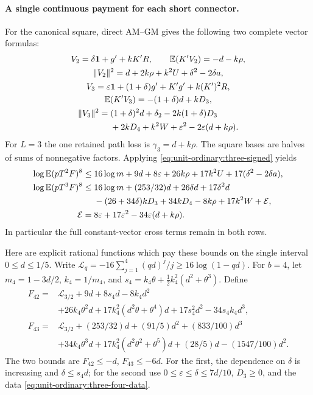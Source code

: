 \paragraph{A single continuous payment for each short connector.}
For the canonical square, direct AM--GM gives the following two
complete vector formulas:
\begin{equation}\label{eq:unit-ordinary:three-short-vectors}
\begin{gathered}
 V_2=\delta\mathbf1+g'+kK'R,\qquad
 \mathbb E(K'V_2)=-d-k\rho,\\
 \|V_2\|^2=d+2k\rho+k^2U+\delta^2-2\delta a,\\
 V_3=\varepsilon\mathbf1+(1+\delta)g'+K'g'+k(K')^2R,\\
 \mathbb E(K'V_3)=-(1+\delta)d+kD_3,\\
 \begin{aligned}
 \|V_3\|^2={}&(1+\delta)^2d+\delta_2-2k(1+\delta)D_3\\
 &+2kD_4+k^2W+\varepsilon^2-2\varepsilon(d+k\rho).
 \end{aligned}
\end{gathered}
\end{equation}
For \(L=3\) the one retained path loss is \(\gamma_3=d+k\rho\).
The square bases are halves of sums of nonnegative factors. Applying
\eqref{eq:unit-ordinary:three-signed} yields
\begin{equation}\label{eq:unit-ordinary:three-short-payments}
\begin{aligned}
 \log\mathbb E(pT^2F)^8\le{}&16\log m+9d+8\varepsilon+26k\rho
                  +17k^2U+17(\delta^2-2\delta a),\\
 \log\mathbb E(pT^3F)^8\le{}&16\log m+(253/32)d+26\delta d+17\delta^2d\\
 &-(26+34\delta)kD_3+34kD_4-8k\rho+17k^2W+\mathcal E,\\
 \mathcal E={}&8\varepsilon+17\varepsilon^2
                         -34\varepsilon(d+k\rho).
\end{aligned}
\end{equation}
In particular the full constant-vector cross terms remain in both rows.

Here are explicit rational functions which pay these bounds on the
single interval \(0\le d\le1/5\). Write
\(\mathcal L_q=-16\sum_{j=1}^4(qd)^j/j\ge16\log(1-qd)\).
For \(b=4\), let \(m_4=1-3d/2\), \(k_4=1/m_4\), and
\(s_4=k_4\theta+\frac12k_4^2(d^2+\theta^3)\). Define
\[
\begin{split}
 F_{42}={}&\mathcal L_{3/2}+9d+8s_4d-8k_4d^2\\
 &+26k_4\theta^2d+17k_4^2(d^2\theta+\theta^4)d
 +17s_4^2d^2-34s_4k_4d^3,\\
 F_{43}={}&\mathcal L_{3/2}+(253/32)d+(91/5)d^2+(833/100)d^3\\
 &+34k_4\theta^3d+17k_4^2(d^2\theta^2+\theta^5)d
 +(28/5)d-(1547/100)d^2.
\end{split}
\]
The two bounds are \(F_{42}\le-d\), \(F_{43}\le-6d\).
For the first, the dependence on \(\delta\) is increasing and
\(\delta\le s_4d\); for the second use
\(0\le\varepsilon\le\delta\le7d/10\), \(D_3\ge0\),
and the data \eqref{eq:unit-ordinary:three-four-data}.

